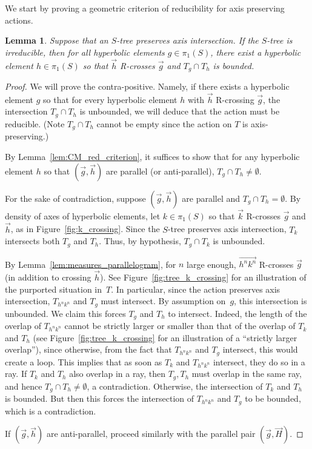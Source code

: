 \documentclass[11pt]{amsart}
\newcommand{\ora}[1]{\overrightarrow{#1}}
\numberwithin{equation}{section}
\numberwithin{figure}{section}
\newtheorem{lemma}[theorem]{Lemma}
\theoremstyle{definition}
\theoremstyle{plain}
\begin{document}
We start by proving a geometric criterion of reducibility for axis preserving actions.

\begin{lemma}
Suppose that an $S$-tree preserves axis intersection. If the $S$-tree
is irreducible, then for all hyperbolic elements $g \in \pi_1(S)$,
there exist a hyperbolic element $h \in \pi_1(S)$ so that $\ora{h}$
R-crosses $\ora{g}$ and $T_g \cap T_h$ is bounded.
\label{lem:if_unbounded_then_reducible}
\end{lemma}
\begin{proof}
    We will prove the contra-positive. Namely, if there exists a hyperbolic
    element $g$ so that for every hyperbolic element $h$ with $\ora{h}$ R-crossing
    $\ora{g}$, the intersection $T_g \cap T_h$ is unbounded, we will deduce
    that the action must be reducible. (Note $T_g \cap T_h$ cannot be
    empty since the action on $T$ is axis-preserving.)
    
    By Lemma~\ref{lem:CM_red_criterion}, it suffices to show that for any hyperbolic element $h$ so that $(\ora{g},\ora{h})$ are parallel (or anti-parallel), $T_g \cap T_h \neq \emptyset$.

    For the sake of contradiction, suppose $(\ora{g},\ora{h})$ are parallel and $T_g \cap T_h = \emptyset$. By density of axes of hyperbolic elements, let $k \in \pi_1(S)$ so that $\ora{k}$ R-crosses $\ora{g}$ and $\ora{h}$, as in Figure~\ref{fig:k_crossing}. Since the $S$-tree preserves axis intersection, $T_k$ intersects both $T_g$ and $T_h$. Thus, by hypothesis, $T_g \cap T_k$ is unbounded.
      
    By Lemma~\ref{lem:measures_parallelogram}, for $n$ large enough,
    $\ora{h^nk^n}$ R-crosses $\ora{g}$ (in addition to crossing $\ora{h}$). See
    Figure~\ref{fig:tree_k_crossing} for an illustration of the
    purported situation in~$T$. In
    particular, since the action preserves axis intersection, $T_{h^nk^n}$ and
    $T_g$ must intersect. By assumption on~$g$, this intersection is unbounded.
      We claim this forces $T_g$ and $T_h$ to intersect. Indeed,  the length of the overlap of $T_{h^nk^n}$ cannot be strictly larger or smaller than that of the overlap of $T_k$ and $T_h$ (see Figure~\ref{fig:tree_k_crossing} for an illustration of a ``strictly larger overlap''), since otherwise, from the fact that $T_{h^nk^n}$ and $T_g$ intersect, this would create a loop. This implies that as soon as $T_k$ and $T_{h^nk^n}$ intersect, they do so in a ray. If $T_k$ and $T_h$ also overlap in a ray, then $T_g, T_h$ must overlap in the same ray, and hence $T_g \cap T_h \neq \emptyset$, a contradiction. Otherwise, the intersection of $T_k$ and $T_h$ is bounded. But then this forces the intersection of $T_{h^nk^n}$ and $T_g$ to be bounded, which is a contradiction.
    
    If $(\ora{g},\ora{h})$ are anti-parallel, proceed similarly with the parallel pair $(\ora{g},\ora{H})$.
\end{proof}
\end{document}
